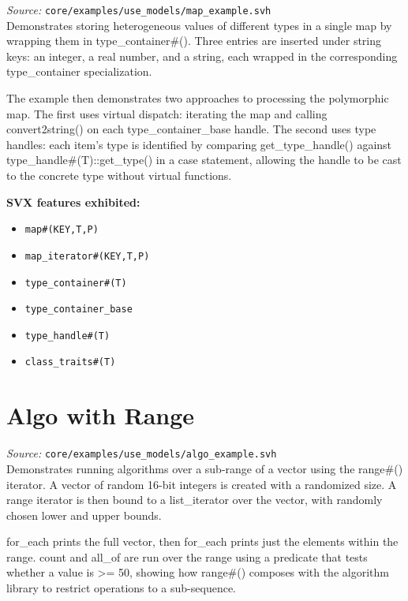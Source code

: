 \documentclass[11pt,letterpaper]{report}
\begin{document}
\textit{Source:} \texttt{core/examples/use\_models/map\_example.svh}\\

Demonstrates storing heterogeneous values of different types in a single map by wrapping them in type\_container\#(). Three entries are inserted under string keys: an integer, a real number, and a string, each wrapped in the corresponding type\_container specialization.

The example then demonstrates two approaches to processing the polymorphic map. The first uses virtual dispatch: iterating the map and calling convert2string() on each type\_container\_base handle. The second uses type handles: each item's type is identified by comparing get\_type\_handle() against type\_handle\#(T)::get\_type() in a case statement, allowing the handle to be cast to the concrete type without virtual functions.

\textbf{SVX features exhibited:}

\begin{itemize}
  \item \texttt{map\#(KEY,T,P)}
  \item \texttt{map\_iterator\#(KEY,T,P)}
  \item \texttt{type\_container\#(T)}
  \item \texttt{type\_container\_base}
  \item \texttt{type\_handle\#(T)}
  \item \texttt{class\_traits\#(T)}
\end{itemize}
\section{Algo with Range}

\textit{Source:} \texttt{core/examples/use\_models/algo\_example.svh}\\

Demonstrates running algorithms over a sub-range of a vector using the range\#() iterator. A vector of random 16-bit integers is created with a randomized size. A range iterator is then bound to a list\_iterator over the vector, with randomly chosen lower and upper bounds.

for\_each prints the full vector, then for\_each prints just the elements within the range. count and all\_of are run over the range using a predicate that tests whether a value is >= 50, showing how range\#() composes with the algorithm library to restrict operations to a sub-sequence.
\end{document}
